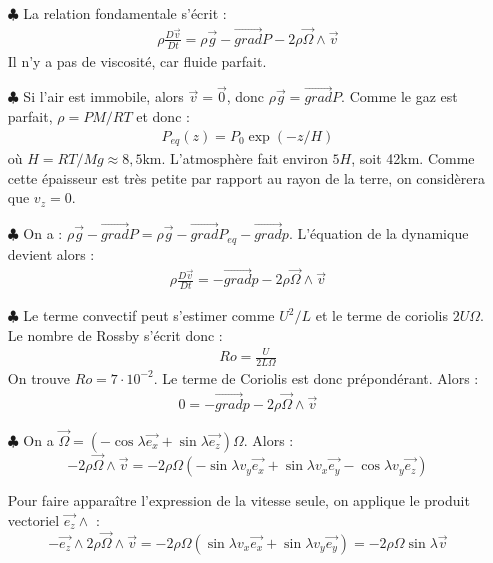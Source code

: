 \documentclass{report}
\begin{document}
\begin{itemize}

	\item[$\clubsuit$] La relation fondamentale s'écrit :
	\begin{align*}
		\rho\frac{D\vec{v}}{Dt}=\rho\vec{g}-\vec{grad}P-2\rho\vec{\Omega}\wedge\vec{v}
	\end{align*}
Il n'y a pas de viscosité, car fluide parfait.

	\item[$\clubsuit$] Si l'air est immobile, alors $\vec{v}=\vec{0}$, donc $\rho\vec{g}=\vec{grad}P$. Comme le gaz est parfait, $\rho=PM/RT$ et donc :
	\begin{align*}
		P_{eq}(z)=P_0\exp(-z/H)
	\end{align*}
	où $H=RT/Mg\approx8,5$km. L'atmosphère fait environ $5H$, soit 42km. Comme cette épaisseur est très petite par rapport au rayon de la terre, on considèrera que $v_z=0$.
	
	\item[$\clubsuit$] On a : $\rho\vec{g}-\vec{grad}P=\rho\vec{g}-\vec{grad}P_{eq}-\vec{grad}p$. L'équation de la dynamique devient alors :
		\begin{align*}
		\rho\frac{D\vec{v}}{Dt}=-\vec{grad}p-2\rho\vec{\Omega}\wedge\vec{v}
	\end{align*}
	
	\item[$\clubsuit$] Le terme convectif peut s'estimer comme $U^2/L$ et le terme de coriolis $2U\Omega$. Le nombre de Rossby s'écrit donc :
	\begin{align*}
		Ro = \frac{U}{2L\Omega}
	\end{align*}
	On trouve $Ro=7\cdot10^{-2}$. Le terme de Coriolis est donc prépondérant. Alors : 
			\begin{align*}
		0=-\vec{grad}p-2\rho\vec{\Omega}\wedge\vec{v}
	\end{align*}
	
	\item[$\clubsuit$] On a $\vec{\Omega}=(-\cos\lambda\vec{e_x}+\sin\lambda\vec{e_z})\Omega$. Alors : 
	\begin{equation}
		-2\rho\vec{\Omega}\wedge\vec{v}=-2\rho\Omega(-\sin\lambda v_y\vec{e_x}+\sin\lambda v_x\vec{e_y}-\cos\lambda v_y\vec{e_z})
	\end{equation}
	
	Pour faire apparaître l'expression de la vitesse seule, on applique le produit vectoriel $\vec{e_z}\wedge$ :
	\begin{equation}
		-\vec{e_z}\wedge2\rho\vec{\Omega}\wedge\vec{v}=-2\rho\Omega(\sin\lambda v_x\vec{e_x}+\sin\lambda v_y\vec{e_y})=-2\rho\Omega \sin\lambda\vec{v}
	\end{equation}
	

\end{itemize}
\end{document}
